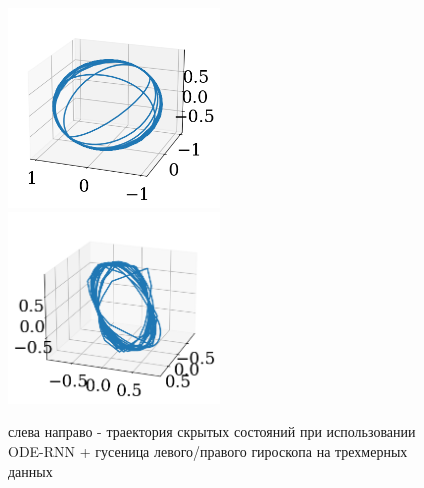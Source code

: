 \documentclass[12pt, twoside]{article}
\begin{document}
\begin{figure}[h!]
	\includegraphics[width = 0.5\textwidth,height=0.3\textheight]{images/left_3d.jpg} \hfill
	\includegraphics[width = 0.5\textwidth,height=0.3\textheight]{images/right_3d.jpg} 
	\caption{слева направо - траектория скрытых состояний при использовании ODE-RNN + гусеница левого/правого гироскопа на трехмерных данных}
	\label{method_apply}
\end{figure}
\end{document}
